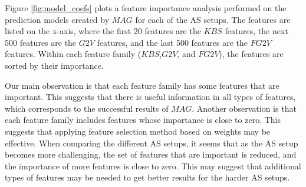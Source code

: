 \documentclass{ecai}
\newcommand{\Carmel}[1]{\textcolor{red}{\textsc{Carmel}: #1}}
\newcommand{\Roni}[1]{}
\newcommand{\gtv}[1]{\ensuremath{\textit{G2V}}\xspace}
\newcommand{\fgtv}[1]{\ensuremath{\textit{FG2V}}\xspace}
\newcommand{\kaduri}[1]{\ensuremath{\textit{KBS}}\xspace}
\newcommand{\mapfgas}[1]{\ensuremath{\textit{MAG}}\xspace}
\begin{document}
Figure \ref{fig:model_coefs} plots a feature importance analysis performed on the prediction models created by \mapfgas\ for each of the AS setups. The features are listed on the x-axis, where the first 20 features are the \kaduri\ features, the next 500 features are the \gtv\ features, and the last 500 features are the \fgtv\ features. Within each feature family (\kaduri\ ,\gtv\ , and \fgtv\ ), the features are sorted by their importance. 


Our main observation is that each feature family has some features that are important. This suggests that there is useful information in all types of features, which corresponds to the successful results of \mapfgas\ . 
Another observation is that each feature family includes features whose importance is close to zero. This suggests that applying feature selection method based on weights may be effective. 
When comparing the different AS setups, it seems that as the AS setup becomes more challenging, the set of features that are important is reduced, and the importance of more features is close to zero. This may suggest that additional types of features  may be needed to get better results for the harder AS setups. 
\end{document}

